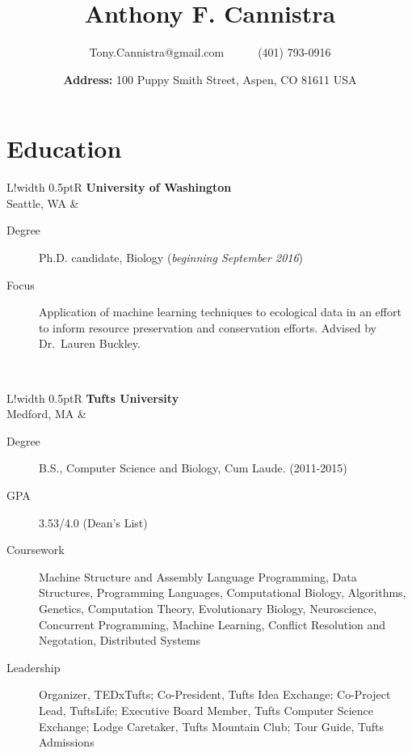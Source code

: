 \documentclass[10pt, letter]{article}
\title{\vspace{-80pt}\bfseries Anthony F. Cannistra\vspace{-10pt}}
\author{Tony.Cannistra@gmail.com~~~~~~(401) 793-0916}
\date{\vspace{-6pt}\small{
\textbf{Address:} 100 Puppy Smith Street, Aspen, CO 81611 USA
\vspace{-20pt}
}
}
\newcommand\VRule{\color{lightgray}\vrule width 0.5pt}
\begin{document}
\maketitle
\thispagestyle{empty}

\section*{Education}

\begin{tabular}{L!{\VRule}R}
\textbf{University of Washington} \\ Seattle, WA &
\vspace{-16.7pt}
\begin{description}
\item [Degree] Ph.D. candidate, Biology (\emph{beginning September 2016})
\item [Focus] Application of machine learning techniques to ecological data in an effort to inform resource preservation and conservation efforts. Advised by Dr.~Lauren Buckley.
\end{description} \\

\end{tabular}
\begin{tabular}{L!{\VRule}R}
\textbf{Tufts University} \\ Medford, MA &
\vspace{-16.7pt}
\begin{description}
\item[Degree] B.S., Computer Science and Biology, Cum Laude. (2011-2015)
\item[GPA] 3.53/4.0 (Dean's List)
\item[Coursework] Machine Structure and Assembly Language Programming, Data Structures, Programming Languages, Computational Biology, Algorithms, Genetics, Computation Theory, Evolutionary Biology, Neuroscience, Concurrent Programming, Machine Learning, Conflict Resolution and Negotation, Distributed Systems
\item[Leadership] Organizer, TEDxTufts; Co-President, Tufts Idea Exchange; Co-Project Lead, TuftsLife; Executive Board Member, Tufts Computer Science Exchange; Lodge Caretaker, Tufts Mountain Club; Tour Guide, Tufts Admissions
\end{description} \\


\end{tabular}
\end{document}
